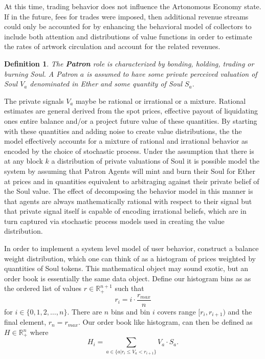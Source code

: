 \documentclass[11pt]{amsart}
\newtheorem{definition}{Definition}
\begin{document}
At this time, trading behavior does not influence the Artonomous Economy state. If in the future, fees for trades were imposed, then additional revenue streams could only be accounted for by enhancing the behavioral model of collectors to include both attention and distributions of value functions in order to estimate the rates of artwork circulation and account for the related revenues.

\begin{definition}
The \textbf{Patron} role is characterized by bonding, holding, trading or burning Soul.  A Patron $a$ is assumed to have some private perceived valuation of Soul $V_a$ denominated in Ether and some quantity of Soul $S_a$.  
\end{definition}

The private signals $V_a$ maybe be rational or irrational or a mixture. Rational estimates are general derived from the spot prices, effective payout of liquidating ones entire balance and/or a project future value of these quantities. By starting with these quantities and adding noise to create value distributions, the the model effectively accounts for a mixture of rational and irrational behavior as encoded by the choice of stochastic process. Under the assumption that there is at any block $k$ a distribution of private valuations of Soul it is possible model the system by assuming that Patron Agents will  mint and burn their Soul for Ether at prices and in quantities equivalent to arbitraging against their private belief of the Soul value. The effect of decomposing the behavior model in this manner is that agents are always mathematically rational with respect to their signal but that private signal itself is capable of encoding irrational beliefs, which are in turn captured via stochastic process models used in creating the value distribution.

In order to implement a system level model of user behavior, construct a balance weight distribution, which one can think of as a histogram of prices weighted by quantities of Soul tokens. This mathematical object may sound exotic, but an order book is essentially the same data object. Define our histogram bins as as the ordered list of values $r\in\mathbb{R}_+^{n+1}$ such that 
\begin{equation}
r_i = i \cdot \frac{r_{max}}{n}
\end{equation}
for $i \in \{0,1,2,\ldots, n\}$. There are $n$ bins and bin $i$ covers range $[r_i, r_{i+1})$ and the final element, $r_{n}=r_{max}$. Our order book like histogram, can then be defined as $H\in\mathbb{R}_+^n$ where 
\begin{equation}
H_i = \sum_{a\in \{a | r_i\le V_a < r_{i+1}\}  } V_a \cdot S_a.
\end{equation}
\end{document}
